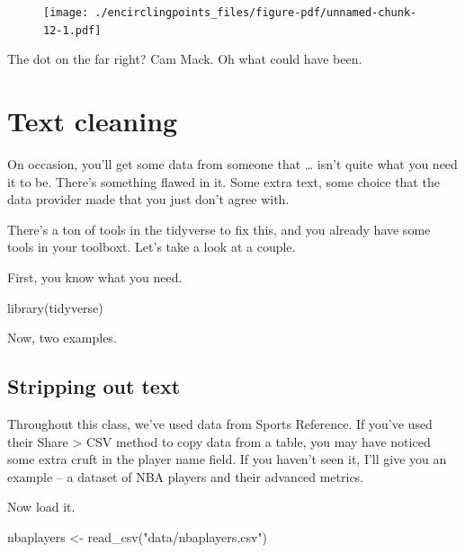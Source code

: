 \documentclass[
  letterpaper,
  DIV=11,
  numbers=noendperiod]{scrreprt}
\newenvironment{Shaded}{\begin{snugshade}}{\end{snugshade}}
\newcommand{\FunctionTok}[1]{\textcolor[rgb]{0.28,0.35,0.67}{#1}}
\newcommand{\NormalTok}[1]{\textcolor[rgb]{0.00,0.23,0.31}{#1}}
\newcommand{\OtherTok}[1]{\textcolor[rgb]{0.00,0.23,0.31}{#1}}
\newcommand{\StringTok}[1]{\textcolor[rgb]{0.13,0.47,0.30}{#1}}
\begin{document}
\begin{figure}[H]

{\centering \texttt{[image: ./encirclingpoints\_files/figure-pdf/unnamed-chunk-12-1.pdf]}

}

\end{figure}

The dot on the far right? Cam Mack. Oh what could have been.


\hypertarget{text-cleaning}{%
\chapter{Text cleaning}\label{text-cleaning}}

On occasion, you'll get some data from someone that \ldots{} isn't quite
what you need it to be. There's something flawed in it. Some extra text,
some choice that the data provider made that you just don't agree with.

There's a ton of tools in the tidyverse to fix this, and you already
have some tools in your toolboxt. Let's take a look at a couple.

First, you know what you need.

\begin{Shaded}
\begin{Highlighting}[]
\FunctionTok{library}\NormalTok{(tidyverse)}
\end{Highlighting}
\end{Shaded}

Now, two examples.

\hypertarget{stripping-out-text}{%
\section{Stripping out text}\label{stripping-out-text}}

Throughout this class, we've used data from Sports Reference. If you've
used their Share \textgreater{} CSV method to copy data from a table,
you may have noticed some extra cruft in the player name field. If you
haven't seen it, I'll give you an example -- a dataset of NBA players
and their advanced metrics.

Now load it.

\begin{Shaded}
\begin{Highlighting}[]
\NormalTok{nbaplayers }\OtherTok{\textless{}{-}} \FunctionTok{read\_csv}\NormalTok{(}\StringTok{"data/nbaplayers.csv"}\NormalTok{)}
\end{Highlighting}
\end{Shaded}
\end{document}
